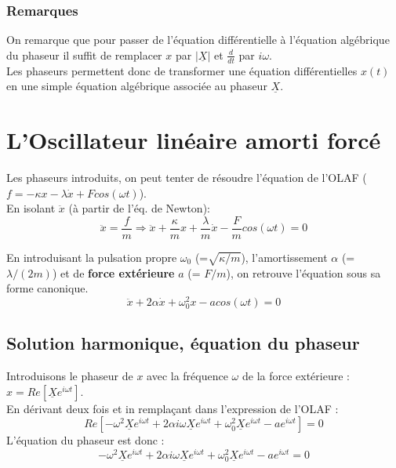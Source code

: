 \documentclass[british,french,11pt, a4paper, openany]{book}
\begin{document}
	\subsubsection*{Remarques}
	On remarque que pour passer de l'équation différentielle à l'équation algébrique du phaseur il suffit de remplacer $x$ par $|\underline{X}|$ et $\frac{d}{dt}$ par $i\omega$.\\
	
	Les phaseurs permettent donc de transformer une équation différentielles $x(t)$ en une simple équation algébrique associée au phaseur $\underline{X}$.
	
	\section{L'Oscillateur linéaire amorti forcé}
	Les phaseurs introduits, on peut tenter de résoudre l'équation de l'OLAF ($f = -\kappa x - \lambda \dot{x} + Fcos(\omega t)$).\\
	En isolant $\ddot{x}$ (à partir de l'éq. de Newton):
	\begin{equation}
		\ddot{x} = \frac{f}{m} \Rightarrow \ddot{x} +\frac{\kappa}{m}x + \frac{\lambda}{m}\dot{x} - \frac{F}{m}cos(\omega t) = 0
	\end{equation}
	
	En introduisant la pulsation propre $\omega_0$ (=$\sqrt{\kappa/m}$), l'amortissement $\alpha$ (= $\lambda/(2m)$) et de \textbf{force extérieure} $a$ (= $F/m$), on retrouve l'équation sous sa forme canonique.
	\begin{equation}
		\ddot{x} + 2\alpha\dot{x} + \omega^2_0 x - a cos(\omega t) = 0
	\end{equation}
	
	\subsection{Solution harmonique, équation du phaseur}
	Introduisons le phaseur de $x$ avec la fréquence $\omega$ de la force extérieure :$x = Re\left[\underline{X}e^{i\omega t} \right]$.\\
	En dérivant deux fois et in remplaçant dans l'expression de l'OLAF :
	\begin{equation}
		Re\left[-\omega^2\underline{X}e^{i\omega t} + 2\alpha i \omega \underline{X}e^{i\omega t} + \omega_0^2 \underline{X}e^{i\omega t} - ae^{i\omega t}\right] = 0
	\end{equation}
	L'équation du phaseur est donc :
	\begin{equation}
		-\omega^2\underline{X}e^{i\omega t} + 2\alpha i \omega \underline{X}e^{i\omega t} + \omega_0^2 \underline{X}e^{i\omega t} - ae^{i\omega t} = 0
	\end{equation}
	
\end{document}
